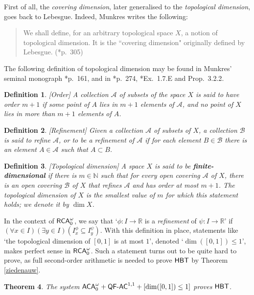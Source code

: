 \documentclass[reqno]{amsart}
\newtheorem{thm}{Theorem}
\newtheorem{defi}[thm]{Definition}
\def\bdefi{\begin{defi}\rm}
\def\edefi{\end{defi}}
\def\RCAo{\textup{\textsf{RCA}}_{0}^{\omega}}
\def\ACAo{\textup{\textsf{ACA}}_{0}^{\omega}}
\def\N{{\mathbb  N}}
\def\R{{\mathbb  R}}
\def\di{\rightarrow}
\def\QFAC{\textup{\textsf{QF-AC}}}
\def\HBT{\textup{\textsf{HBT}}}
\numberwithin{equation}{section}
\numberwithin{thm}{section}
\begin{document}
First of all, the \emph{covering dimension}, later generalised to the \emph{topological dimension}, goes back to Lebesgue.  
Indeed, Munkres writes the following:
\begin{quote}
We shall define, for an arbitrary topological space $X$, a notion of topological dimension. It is the ``covering dimension" originally defined by Lebesgue.  (\cite{munkies}*{p.\ 305})
\end{quote}
The following definition of topological dimension may be found in Munkres' seminal monograph \cite{munkies}*{p.\ 161}, and in \cite{enc2}*{p.\ 274}, \cite{engeltjemijn}*{Ex.\ 1.7.E and Prop.\ 3.2.2}.  %
\bdefi[Order]
A collection $\mathcal{A}$ of subsets of the space $X$ is said to have order $m + 1$ if
some point of $A$ lies in $m +1$ elements of $\mathcal{A}$, and no point of $X$ lies in more than $m +1$
elements of $A$.
\edefi
\bdefi[Refinement]
Given a collection $\mathcal{A}$ of subsets of $X$, a collection $\mathcal{B}$ is said to refine $\mathcal{A}$, or to be
a refinement of $\mathcal{A}$ if for each element $B \in \mathcal{B}$ there is an element $A\in \mathcal{A}$ such that $A\subset B$.
\edefi
\bdefi[Topological dimension]
A space $X$ is said to be \textbf{finite-dimensional} if there is $m\in\N$ such
that for every open covering $\mathcal{A}$ of $X$, there is an open covering $\mathcal{B}$ of $X$ that refines $\mathcal{A}$
and has order at most $m + 1$. The topological dimension of $X$ is the
smallest value of $m$ for which this statement holds; we denote it by $\dim X$.
\edefi
In the context of $\RCAo$, we say that `$\phi:I\di \R$ is a \emph{refinement} of $\psi:I\di \R$' if $(\forall x\in I)(\exists y\in I)(I_{x}^{\phi}\subseteq I_{y}^{\psi})$.  
With this definition in place, statements like `the topological dimension of $[0,1]$ is at most $1$', denoted `$\dim([0,1])\leq1$', makes perfect sense in $\RCAo$.  
Such a statement turns out to be quite hard to prove, as full second-order arithmetic is needed to prove $\HBT$ by Theorem \ref{ziedenauw}.  
\begin{thm}\label{rathergen}
The system $\ACAo+\QFAC^{1,1}+[\dim([0,1])\leq1]$ proves $\HBT$. 
\end{thm}
\end{document}
